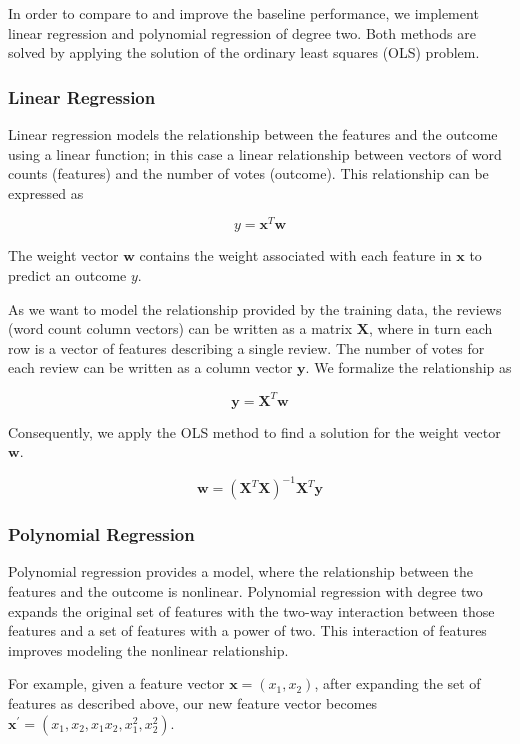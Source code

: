 In order to compare to and improve the baseline performance, we implement linear
regression and polynomial regression of degree two.  Both methods are solved by
applying the solution of the ordinary least squares (OLS) problem.

\subsubsection{Linear Regression}

Linear regression models the relationship between the features and the outcome
using a linear function; in this case a linear relationship between vectors of
word counts (features) and the number of votes (outcome).  This relationship can
be expressed as

\[
  y = \mathbf{x}^T\mathbf{w}
\]

The weight vector $\mathbf{w}$ contains the weight associated with each feature
in $\mathbf{x}$ to predict an outcome $y$.

As we want to model the relationship provided by the training data, the reviews
(word count column vectors) can be written as a matrix $\mathbf{X}$, where in
turn each row is a vector of features describing a single review.  The number of
votes for each review can be written as a column vector $\mathbf{y}$.  We
formalize the relationship as

\[
  \mathbf{y} = \mathbf{X}^T \mathbf{w}
\]

Consequently, we apply the OLS method to find a solution for the weight vector
$\mathbf{w}$.

\[
  \mathbf{w} = {(\mathbf{X}^T \mathbf{X})}^{-1} \mathbf{X}^T \mathbf{y}
\]

\subsubsection{Polynomial Regression}

Polynomial regression provides a model, where the relationship between the
features and the outcome is nonlinear.  Polynomial regression with degree two
expands the original set of features with the two-way interaction between those
features and a set of features with a power of two.  This interaction of
features improves modeling the nonlinear relationship.

For example, given a feature vector $\mathbf{x} = (x_1, x_2)$, after expanding
the set of features as described above, our new feature vector becomes
$\mathbf{x}^{'} = (x_1, x_2, x_1x_2, x_1^2, x_2^2)$.

